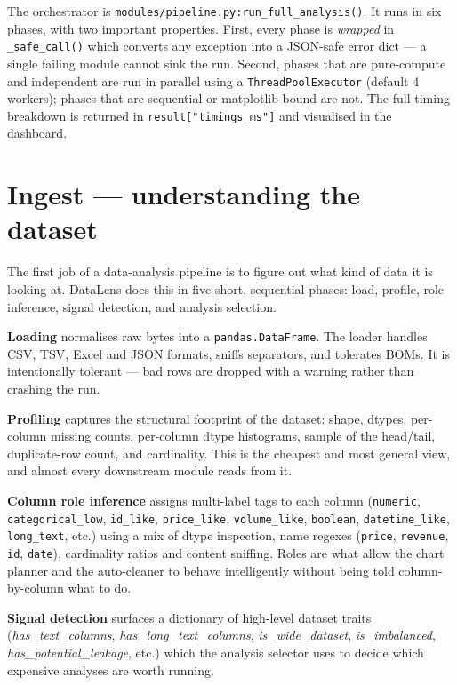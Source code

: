 \documentclass[11pt,a4paper]{article}
\begin{document}
The orchestrator is \texttt{modules/pipeline.py:run\_full\_analysis()}. It
runs in six phases, with two important properties. First, every phase is
\emph{wrapped} in \texttt{\_safe\_call()} which converts any exception into a
JSON-safe error dict --- a single failing module cannot sink the run. Second,
phases that are pure-compute and independent are run in parallel using a
\texttt{ThreadPoolExecutor} (default 4 workers); phases that are sequential
or matplotlib-bound are not. The full timing breakdown is returned in
\texttt{result["timings\_ms"]} and visualised in the dashboard.


\section{Ingest --- understanding the dataset}\label{sec:ingest}

The first job of a data-analysis pipeline is to figure out what kind of data it is looking at. DataLens does this in five short, sequential phases: load, profile, role inference, signal detection, and analysis selection.

\textbf{Loading} normalises raw bytes into a \texttt{pandas.DataFrame}. The loader handles CSV, TSV, Excel and JSON formats, sniffs separators, and tolerates BOMs. It is intentionally tolerant --- bad rows are dropped with a warning rather than crashing the run.

\textbf{Profiling} captures the structural footprint of the dataset: shape, dtypes, per-column missing counts, per-column dtype histograms, sample of the head/tail, duplicate-row count, and cardinality. This is the cheapest and most general view, and almost every downstream module reads from it.

\textbf{Column role inference} assigns multi-label tags to each column (\texttt{numeric}, \texttt{categorical\_low}, \texttt{id\_like}, \texttt{price\_like}, \texttt{volume\_like}, \texttt{boolean}, \texttt{datetime\_like}, \texttt{long\_text}, etc.) using a mix of dtype inspection, name regexes (\texttt{price}, \texttt{revenue}, \texttt{id}, \texttt{date}), cardinality ratios and content sniffing. Roles are what allow the chart planner and the auto-cleaner to behave intelligently without being told column-by-column what to do.

\textbf{Signal detection} surfaces a dictionary of high-level dataset traits (\textit{has\_text\_columns}, \textit{has\_long\_text\_columns}, \textit{is\_wide\_dataset}, \textit{is\_imbalanced}, \textit{has\_potential\_leakage}, etc.) which the analysis selector uses to decide which expensive analyses are worth running.
\end{document}
